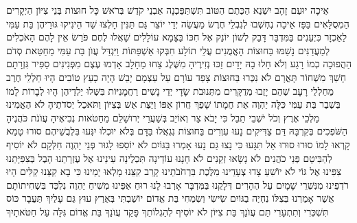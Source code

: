 \documentclass[../main/main.tex]{subfiles}
\begin{document}
\begin{multicols*}{\ncols}
אֵיכָה יוּעַם זָהָב יִשְׁנֶא הַכֶּתֶם הַטּוֹב תִּשְׁתַּפֵּכְנָה אַבְנֵי קֹדֶשׁ בְּרֹאשׁ כָּל חוּצוֹת \ClosedSection{}בְּנֵי צִיּוֹן הַיְקָרִים הַמְסֻלָּאִים בַּפָּז אֵיכָה נֶחְשְׁבוּ לְנִבְלֵי חֶרֶשׂ מַעֲשֵׂה יְדֵי יוֹצֵר \ClosedSection{}גַּם תַּנִּין חָלְצוּ שַׁד הֵינִיקוּ גּוּרֵיהֶן בַּת עַמִּי לַאַכְזָר\SubEnd{} כִּיְעֵנִים\SubEnd{} בַּמִּדְבָּר \ClosedSection{}דָּבַק לְשׁוֹן יוֹנֵק אֶל חִכּוֹ בַּצָּמָא עוֹלָלִים שָׁאֲלוּ לֶחֶם פֹּרֵשׂ אֵין לָהֶם \ClosedSection{}הָאֹכְלִים לְמַעֲדַנִּים נָשַׁמּוּ בַּחוּצוֹת הָאֱמֻנִים עֲלֵי תוֹלָע חִבְּקוּ אַשְׁפַּתּוֹת \ClosedSection{}וַיִּגְדַּל עֲוֺן בַּת עַמִּי מֵחַטַּאת סְדֹם הַהֲפוּכָה כְמוֹ רָגַע וְלֹא חָלוּ בָהּ יָדָיִם \ClosedSection{}זַכּוּ נְזִירֶיהָ מִשֶּׁלֶג צַחוּ מֵחָלָב אָדְמוּ עֶצֶם מִפְּנִינִים סַפִּיר גִּזְרָתָם \ClosedSection{}חָשַׁךְ מִשְּׁחוֹר תָּאֳרָם לֹא נִכְּרוּ בַּחוּצוֹת צָפַד עוֹרָם עַל עַצְמָם יָבֵשׁ הָיָה כָעֵץ \ClosedSection{}טוֹבִים הָיוּ חַלְלֵי חֶרֶב מֵחַלְלֵי רָעָב שֶׁהֵם יָזֻבוּ מְדֻקָּרִים מִתְּנוּבֹת שָׂדָי \ClosedSection{}יְדֵי נָשִׁים רַחֲמָנִיּוֹת בִּשְּׁלוּ יַלְדֵיהֶן הָיוּ לְבָרוֹת לָמוֹ בְּשֶׁבֶר בַּת עַמִּי \ClosedSection{}כִּלָּה יַהְוֶה אֶת חֲמָתוֹ שָׁפַךְ חֲרוֹן אַפּוֹ וַיַּצֶּת אֵשׁ בְּצִיּוֹן וַתֹּאכַל יְסֹדֹתֶיהָ \ClosedSection{}לֹא הֶאֱמִינוּ מַלְכֵי אֶרֶץ וְכֹל יֹשְׁבֵי תֵבֵל כִּי יָבֹא צַר וְאוֹיֵב בְּשַׁעֲרֵי יְרוּשָׁלֵם \ClosedSection{}מֵחַטֹּאות נְבִיאֶיהָ עֲוֺנֹת כֹּהֲנֶיהָ הַשֹּׁפְכִים בְּקִרְבָּהּ דַּם צַדִּיקִים \ClosedSection{}נָעוּ עִוְרִים בַּחוּצוֹת נִגְאֲלוּ בַּדָּם בְּלֹא יוּכְלוּ יִגְּעוּ בִּלְבֻשֵׁיהֶם \ClosedSection{}סוּרוּ טָמֵא קָרְאוּ לָמוֹ סוּרוּ סוּרוּ אַל תִּגָּעוּ כִּי נָצוּ גַּם נָעוּ אָמְרוּ בַּגּוֹיִם לֹא יוֹסִפוּ לָגוּר \ClosedSection{}פְּנֵי יַהְוֶה חִלְּקָם לֹא יוֹסִיף לְהַבִּיטָם פְּנֵי כֹהֲנִים לֹא נָשָׂאוּ זְקֵנִים לֹא חָנָנוּ \ClosedSection{}עוֹדֵינָה תִּכְלֶינָה עֵינֵינוּ אֶל עֶזְרָתֵנוּ הָבֶל בְּצִפִּיָּתֵנוּ צִפִּינוּ אֶל גּוֹי לֹא יוֹשִׁעַ \ClosedSection{}צָדוּ צְעָדֵינוּ מִלֶּכֶת בִּרְחֹבֹתֵינוּ קָרַב קִצֵּנוּ מָלְאוּ יָמֵינוּ כִּי בָא קִצֵּנוּ \ClosedSection{}קַלִּים הָיוּ רֹדְפֵינוּ מִנִּשְׁרֵי שָׁמָיִם עַל הֶהָרִים דְּלָקֻנוּ בַּמִּדְבָּר אָרְבוּ לָנוּ \ClosedSection{}רוּחַ אַפֵּינוּ מְשִׁיחַ יַהְוֶה נִלְכַּד בִּשְׁחִיתוֹתָם אֲשֶׁר אָמַרְנוּ בְּצִלּוֹ נִחְיֶה בַגּוֹיִם \ClosedSection{}שִׂישִׂי וְשִׂמְחִי בַּת אֱדוֹם יוֹשַׁבְתִּי בְּאֶרֶץ עוּץ גַּם עָלַיִךְ תַּעֲבָר כּוֹס תִּשְׁכְּרִי וְתִתְעָרִי \ClosedSection{}תַּם עֲוֺנֵךְ בַּת צִיּוֹן לֹא יוֹסִיף לְהַגְלוֹתֵךְ פָּקַד עֲוֺנֵךְ בַּת אֱדוֹם גִּלָּה עַל חַטֹּאתָיִךְ\OpenSection{}\par

\end{multicols*}
\end{document}

